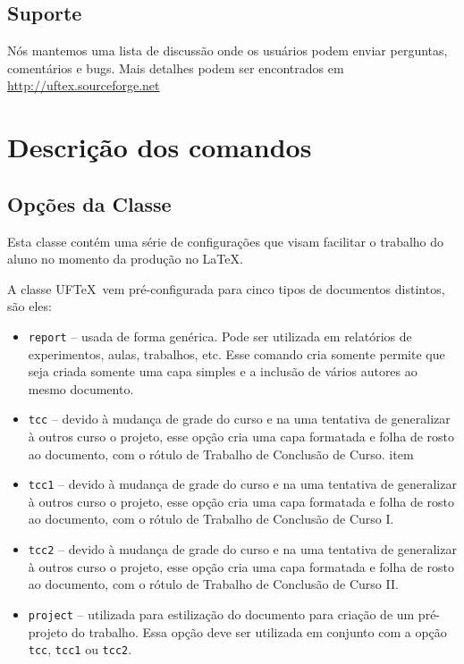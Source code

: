 \documentclass[report]{uftex}
\newcommand\uftex{UF\TeX}
\begin{document}
\section{Suporte}
\label{sec:suporte}
\noindent Nós mantemos uma lista de discussão onde os usuários podem enviar perguntas, comentários e bugs. Mais detalhes podem ser encontrados em \url{http://uftex.sourceforge.net}


\chapter{Descrição dos comandos}
\section{Opções da Classe}
\label{sec:opcoes-da-classe}

\noindent Esta classe contém uma série de configurações que visam facilitar o trabalho do aluno no momento da produção no \LaTeX. 

A classe \uftex\ vem pré-configurada para cinco tipos de documentos distintos, são eles:

\begin{itemize}
	\item
	\verb+report+ -- usada de forma genérica. Pode ser utilizada em relatórios de experimentos, aulas, trabalhos, etc. Esse comando cria somente permite que seja criada somente uma capa simples e a inclusão de vários autores ao mesmo documento.
	\item
	\verb+tcc+ -- devido à mudança de grade do curso e na uma tentativa de generalizar à outros curso o projeto, esse opção cria uma capa formatada e folha de rosto ao documento, com o rótulo de Trabalho de Conclusão de Curso.
	item
	\item 
	\verb+tcc1+ -- devido à mudança de grade do curso e na uma tentativa de generalizar à outros curso o projeto, esse opção cria uma capa formatada e folha de rosto ao documento, com o rótulo de Trabalho de Conclusão de Curso I.
	\item 
	\verb+tcc2+ -- devido à mudança de grade do curso e na uma tentativa de generalizar à outros curso o projeto, esse opção cria uma capa formatada e folha de rosto ao documento, com o rótulo de Trabalho de Conclusão de Curso II.
	\item 
	\verb+project+ -- utilizada para estilização do documento para criação de um pré-projeto do trabalho. Essa opção deve ser utilizada em conjunto com a opção \verb+tcc+, \verb+tcc1+ ou \verb+tcc2+.
\end{itemize}
\end{document}

